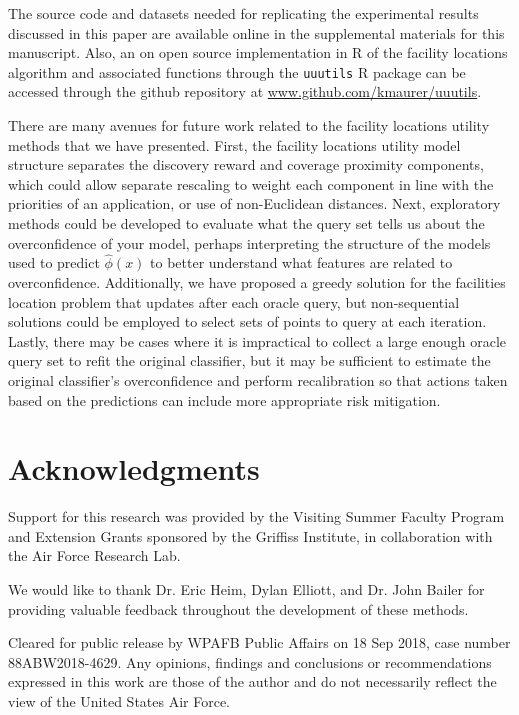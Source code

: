 \documentclass[letterpaper]{article} %
\newcommand{\km}[1]{{\color{red} #1}} %
\begin{document}
The source code and datasets needed for replicating the experimental results discussed in this paper are available online in the supplemental materials for this manuscript. Also, an on open source  implementation in R \citep{R} of the facility locations algorithm and associated functions through the \km{\texttt{uuutils}} R package can be accessed through the github repository at \km{\url{www.github.com/kmaurer/uuutils}}.

There are many avenues for future work related to the facility locations utility methods that we have presented. First, the facility locations utility model structure separates the discovery reward and coverage proximity components, which could allow separate rescaling to weight each component in line with the priorities of an application, or use of non-Euclidean distances. Next, exploratory methods could be developed to evaluate what the query set tells us about the overconfidence of your model, perhaps interpreting the structure of the models used to predict $\hat{\phi}(x)$ to better understand what features are related to overconfidence. Additionally, we have proposed a greedy solution for the facilities location problem that updates after each oracle query, but non-sequential solutions could be employed to select sets of points to query at each iteration. Lastly, there may be cases where it is impractical to collect a large enough oracle query set to refit the original classifier, but it may be sufficient to estimate the original classifier’s overconfidence and perform recalibration so that actions taken based on the predictions can include more appropriate risk mitigation. 

\section{Acknowledgments} 

Support for this research was provided by the Visiting Summer Faculty Program and Extension Grants sponsored by the Griffiss Institute, in collaboration with the Air Force Research Lab. 

We would like to thank Dr. Eric Heim, Dylan Elliott, and Dr. John Bailer for providing valuable feedback throughout the development of these methods. 

Cleared for public release by WPAFB Public Affairs on 18 Sep 2018, case number 88ABW2018-4629.  Any opinions, findings and conclusions or recommendations expressed in this work are those of the author and do not necessarily reflect the view of the United States Air Force.

\newpage



\end{document}
